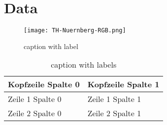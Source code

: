 \chapter{Data}\label{ch:data}

\Blindtext

\begin{figure}
	\centering
	\texttt{[image: TH-Nuernberg-RGB.png]}\\
	\caption[shortname in list of figures]{caption with label \label{fig: CloudStack}}
\end{figure}

\begin{table}[h]
	\centering
	\begin{tabular}{|C{5cm}|C{8cm}|}
		\hline 
		\textbf{Kopfzeile Spalte 0} & \textbf{Kopfzeile Spalte 1} \\ 
		\hline 
		Zeile 1 Spalte 0 & Zeile 1 Spalte 1 \\
		\hline
		Zeile 2 Spalte 0 & Zeile 2 Spalte 1 \\
		\hline
	\end{tabular}
	\caption[shortname in list of tabels]{\centering caption with labels \label{tab: Erfuellung}}
\end{table}